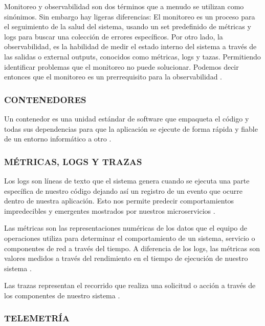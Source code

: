 \documentclass[a4paper,12pt]{article}
\begin{document}
Monitoreo y observabilidad son dos términos que a menudo se utilizan como sinónimos. Sin embargo hay
ligeras diferencias: El monitoreo es un proceso para el seguimiento de la salud del sistema, usando 
un set predefinido de métricas y logs para buscar una colección de errores específicos. Por otro lado,
la observabilidad, es la habilidad de medir el estado interno del sistema a través de las salidas o 
external outputs, conocidos como métricas, logs y tazas. Permitiendo identificar problemas que el 
monitoreo no puede solucionar. Podemos decir entonces que el monitoreo es un prerrequisito para la 
observabilidad \cite{survey_observability}.


\subsubsection{\small CONTENEDORES}

Un contenedor es una unidad estándar de software que empaqueta el código y todas sus dependencias 
para que la aplicación se ejecute de forma rápida y fiable de un entorno informático a otro \cite{microsoft_docker}.

\subsubsection{\small MÉTRICAS, LOGS Y TRAZAS}

Los logs son líneas de texto que el sistema genera cuando se ejecuta una parte específica de nuestro
código dejando así un registro de un evento que ocurre dentro de nuestra aplicación. 
Esto nos permite predecir comportamientos impredecibles y emergentes mostrados por nuestros microservicios \cite{survey_observability}.
\vspace{12pt}

Las métricas son las representaciones numéricas de los datos que el equipo de operaciones utiliza 
para determinar el comportamiento de un sistema, servicio o componentes de red a través del tiempo. 
A diferencia de los logs, las métricas son valores medidos a través del rendimiento en el tiempo de 
ejecución de nuestro sistema \cite{survey_observability}.

\vspace{12pt}
Las trazas representan el recorrido que realiza una solicitud o acción a través de los componentes 
de nuestro sistema \cite{survey_observability}.

\subsubsection{\small TELEMETRÍA}
\end{document}
